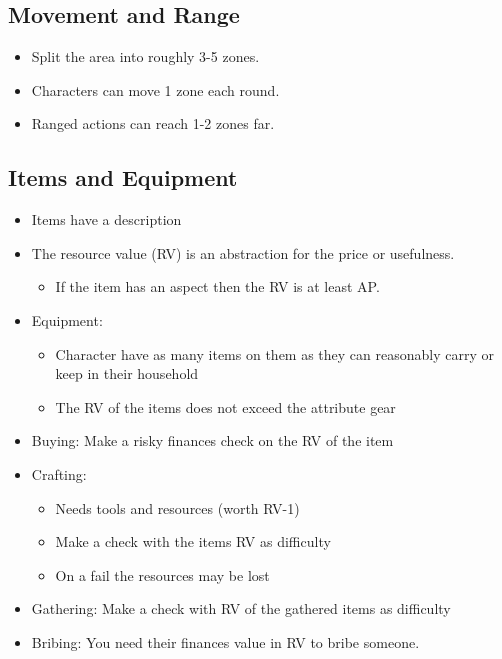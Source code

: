 \documentclass[11pt]{article}
\begin{document}
{\subsection{Movement and Range}
\label{sec:org54ca577}
\begin{itemize}
\item Split the area into roughly 3-5 zones.
\item Characters can move 1 zone each round.
\item Ranged actions can reach 1-2 zones far.
\end{itemize}

\subsection{Items and Equipment}
\label{sec:org395d206}
\begin{itemize}
\item Items have a description
\item The resource value (RV) is an abstraction for the price or usefulness.
\begin{itemize}
\item If the item has an aspect then the RV is at least AP.
\end{itemize}
\item Equipment:
\begin{itemize}
\item Character have as many items on them as they can reasonably carry or keep in their household
\item The RV of the items does not exceed the attribute gear
\end{itemize}
\item Buying: Make a risky finances check on the RV of the item
\item Crafting:
\begin{itemize}
\item Needs tools and resources (worth RV-1)
\item Make a check with the items RV as difficulty
\item On a fail the resources may be lost
\end{itemize}
\item Gathering: Make a check with RV of the gathered items as difficulty
\item Bribing: You need their finances value in RV to bribe someone.
\end{itemize}

\newpage

}
\end{document}
